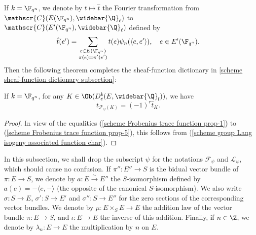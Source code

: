 If $k=\F_{q^n}$, we denote by $t\mapsto\hat{t}$ the Fourier transformation from $\mathscr{C}(E(\F_{q^n}),\widebar{\Q}_\ell)$ to $\mathscr{C}(E'(\F_{q^n}),\widebar{\Q}_\ell)$ defined by
\[\hat{t}(e')=\sum_{\substack{e\in E(\F_{q^n})\\ \pi(e)=\pi'(e')}}t(e)\psi_{n}(\langle e,e'\rangle),\quad e\in E'(\F_{q^n}).\]
Then the following theorem completes the sheaf-function dictionary in \autoref{scheme sheaf-function dictionary subsection}:

\begin{theorem}\label{scheme Fourier-Deligne transform associated function char}
If $k=\F_{q^n}$, for any $K\in\Ob(D^b_c(E,\widebar{\Q}_l))$, we have
\[t_{\mathscr{F}_\psi(K)}=(-1)^r\hat{t}_K.\]
\end{theorem}
\begin{proof}
In view of the equalities (\ref{scheme Frobenius trace function prop-1}) to (\ref{scheme Frobenius trace function prop-5}), this follows from (\ref{scheme group Lang isogeny associated function char}).
\end{proof}

In this subsection, we shall drop the subscript $\psi$ for the notations $\mathscr{F}_\psi$ and $\mathscr{L}_\psi$, which should cause no confusion. If $\pi'':E''\to S$ is the bidual vector bundle of $\pi:E\to S$, we denote by $a:E\stackrel{\sim}{\to}E''$ the $S$-isomorphism defined by $a(e)=-\langle e,-\rangle$ (the opposite of the canonical $S$-isomorphism). We also write $\sigma:S\to E$, $\sigma':S\to E'$ and $\sigma'':S\to E''$ for the zero sections of the corresponding vector bundles. We denote by $\mu:E\times_SE\to E$ the addition law of the vector bundle $\pi:E\to S$, and $\iota:E\to E$ the inverse of this addition. Finally, if $n\in\Z$, we denote by $\lambda_n:E\to E$ the multiplication by $n$ on $E$.

